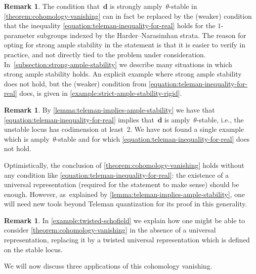 \documentclass[11pt]{article}
\theoremstyle{plain}
\theoremstyle{definition}
\newtheorem{remark}[theorem]{Remark}
\newcommand\dash{\nobreakdash-\hspace{0pt}}
\newcommand\tuple[1]{\ensuremath{{\boldsymbol{#1}}}}
\begin{document}
\begin{remark}
\label{remark:strong-ample-stability}
The condition that~$\tuple{d}$ is strongly amply~$\theta$\dash stable
in \cref{theorem:cohomology-vanishing} can in fact be replaced by
the (weaker) condition
that the inequality \eqref{equation:teleman-inequality-for-real}
holds for the $1$-parameter subgroups indexed by the Harder--Narasimhan strata.
The reason for opting for strong ample stability in the statement
is that it is easier to verify in practice,
and not directly tied to the problem under consideration. In~\cref{subsection:strong-ample-stability} we describe many situations
in which strong ample stability holds.
An explicit example where strong ample stability does not hold,
but the (weaker) condition from \eqref{equation:teleman-inequality-for-real} does,
is given in \cref{example:strict-ample-stability-rigid}.
\end{remark}

\begin{remark}
\label{remark:ample-stability}
By \cref{lemma:teleman-implies-ample-stability}
we have that \eqref{equation:teleman-inequality-for-real}
implies that~$\tuple{d}$ is amply~$\theta$\dash stable,
i.e., the unstable locus has codimension at least~2.
We have not found a single example which is amply~$\theta$-stable
and for which \eqref{equation:teleman-inequality-for-real} does not hold.

Optimistically, the conclusion of \cref{theorem:cohomology-vanishing} holds
without any condition like \eqref{equation:teleman-inequality-for-real}:
the existence of a universal representation (required for the statement to make sense)
should be enough.
However, as~explained by \cref{lemma:teleman-implies-ample-stability},
one will need new tools beyond Teleman quantization for its proof in this generality.
\end{remark}

\begin{remark}
In \cref{example:twisted-schofield}
we explain how one might be able to consider \cref{theorem:cohomology-vanishing}
in the absence of a universal representation,
replacing it by a twisted universal representation
which is defined on the stable locus.
\end{remark}

We will now discuss three applications of this cohomology vanishing.
\end{document}
